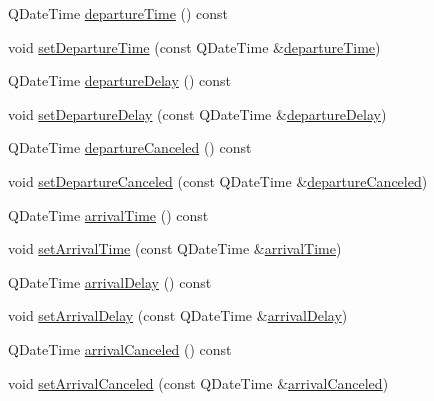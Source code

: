 \begin{DoxyCompactItemize}
\item 
Q\+Date\+Time \mbox{\hyperlink{classCSA_1_1VehicleStop_af7ffcbe1b8db9a40a6cb1c438e6d7a88}{departure\+Time}} () const
\item 
void \mbox{\hyperlink{classCSA_1_1VehicleStop_a29ada511d6218e2421db889a9ef054be}{set\+Departure\+Time}} (const Q\+Date\+Time \&\mbox{\hyperlink{classCSA_1_1VehicleStop_af7ffcbe1b8db9a40a6cb1c438e6d7a88}{departure\+Time}})
\item 
Q\+Date\+Time \mbox{\hyperlink{classCSA_1_1VehicleStop_afc861cba10fcf05779c222fd57f6beeb}{departure\+Delay}} () const
\item 
void \mbox{\hyperlink{classCSA_1_1VehicleStop_aaa5f7c51e5352715fb0e701b3d7560f0}{set\+Departure\+Delay}} (const Q\+Date\+Time \&\mbox{\hyperlink{classCSA_1_1VehicleStop_afc861cba10fcf05779c222fd57f6beeb}{departure\+Delay}})
\item 
Q\+Date\+Time \mbox{\hyperlink{classCSA_1_1VehicleStop_aa02b0117621a7e90a2c38ed10f19a9ee}{departure\+Canceled}} () const
\item 
void \mbox{\hyperlink{classCSA_1_1VehicleStop_afb79c95edf287cd5b40064d1cc94957e}{set\+Departure\+Canceled}} (const Q\+Date\+Time \&\mbox{\hyperlink{classCSA_1_1VehicleStop_aa02b0117621a7e90a2c38ed10f19a9ee}{departure\+Canceled}})
\item 
Q\+Date\+Time \mbox{\hyperlink{classCSA_1_1VehicleStop_af28bb79013b8a29ffedfdd0cc0c96ec7}{arrival\+Time}} () const
\item 
void \mbox{\hyperlink{classCSA_1_1VehicleStop_a96a162d068673f455660531ad549400e}{set\+Arrival\+Time}} (const Q\+Date\+Time \&\mbox{\hyperlink{classCSA_1_1VehicleStop_af28bb79013b8a29ffedfdd0cc0c96ec7}{arrival\+Time}})
\item 
Q\+Date\+Time \mbox{\hyperlink{classCSA_1_1VehicleStop_aa60b346aae368af817fdc0e5d6e3fe30}{arrival\+Delay}} () const
\item 
void \mbox{\hyperlink{classCSA_1_1VehicleStop_ada38acdf633877ba25fa3ada9961c0f6}{set\+Arrival\+Delay}} (const Q\+Date\+Time \&\mbox{\hyperlink{classCSA_1_1VehicleStop_aa60b346aae368af817fdc0e5d6e3fe30}{arrival\+Delay}})
\item 
Q\+Date\+Time \mbox{\hyperlink{classCSA_1_1VehicleStop_a62b0692553adc574939b90a64e91858d}{arrival\+Canceled}} () const
\item 
void \mbox{\hyperlink{classCSA_1_1VehicleStop_a2e5b2e1f111d09a7be6acd933604cd51}{set\+Arrival\+Canceled}} (const Q\+Date\+Time \&\mbox{\hyperlink{classCSA_1_1VehicleStop_a62b0692553adc574939b90a64e91858d}{arrival\+Canceled}})

\end{DoxyCompactItemize}
